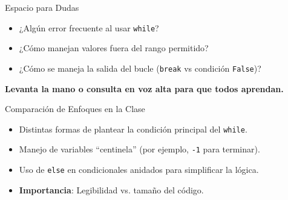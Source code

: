 \documentclass[10pt]{beamer}
\begin{document}
\begin{frame}{Espacio para Dudas}
  \begin{itemize}
    \item ¿Algún error frecuente al usar \texttt{while}?
    \item ¿Cómo manejan valores fuera del rango permitido?
    \item ¿Cómo se maneja la salida del bucle (\texttt{break} vs condición \texttt{False})?
  \end{itemize}
  \vspace{0.3cm}
  \textbf{Levanta la mano o consulta en voz alta para que todos aprendan.}
\end{frame}

\begin{frame}{Comparación de Enfoques en la Clase}
  \begin{itemize}
    \item Distintas formas de plantear la condición principal del \texttt{while}.
    \item Manejo de variables “centinela” (por ejemplo, \texttt{-1} para terminar).
    \item Uso de \texttt{else} en condicionales anidados para simplificar la lógica.
    \item \textbf{Importancia}: Legibilidad vs. tamaño del código.
  \end{itemize}
\end{frame}
\end{document}
